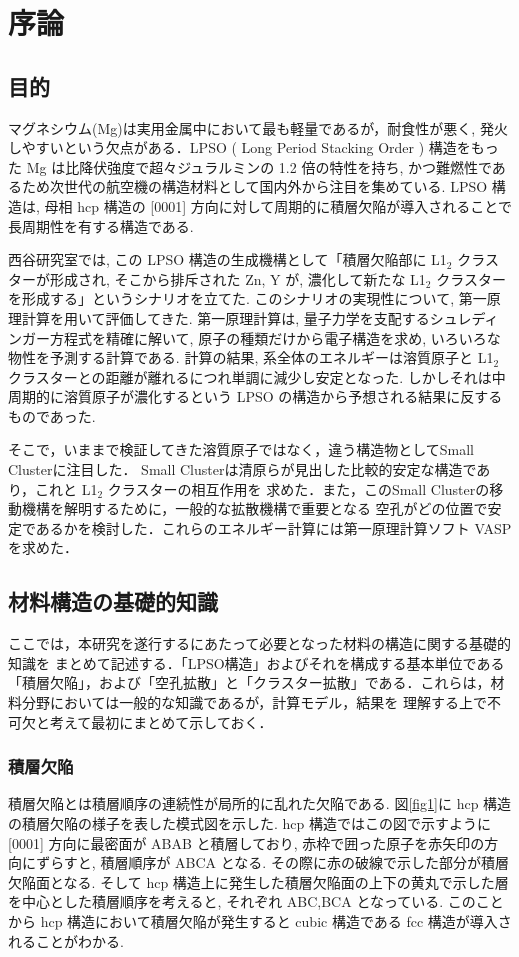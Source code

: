 \chapter{序論}

\section{目的}

マグネシウム(Mg)は実用金属中において最も軽量であるが，耐食性が悪く, 発火しやすいという欠点がある．LPSO ( Long Period Stacking Order ) 構造をもった Mg は比降伏強度で超々ジュラルミンの 1.2 倍の特性を持ち, かつ難燃性であるため次世代の航空機の構造材料として国内外から注目を集めている\cite{Th}. LPSO 構造は, 母相 hcp 構造の [0001] 方向に対して周期的に積層欠陥が導入されることで長周期性を有する構造である.

西谷研究室では, この LPSO 構造の生成機構として「積層欠陥部に L1$_2$ クラスターが形成され, そこから排斥された Zn, Y が, 濃化して新たな L1$_2$ クラスターを形成する」というシナリオを立てた. このシナリオの実現性について, 第一原理計算を用いて評価してきた. 第一原理計算は, 量子力学を支配するシュレディンガー方程式を精確に解いて, 原子の種類だけから電子構造を求め, いろいろな物性を予測する計算である. 計算の結果, 系全体のエネルギーは溶質原子と L1$_2$ クラスターとの距離が離れるにつれ単調に減少し安定となった. しかしそれは中周期的に溶質原子が濃化するという LPSO の構造から予想される結果に反するものであった.

そこで，いままで検証してきた溶質原子ではなく，違う構造物としてSmall Clusterに注目した．
Small Clusterは清原らが見出した比較的安定な構造であり，これと L1$_2$ クラスターの相互作用を
求めた\cite{kiyohara}．また，このSmall Clusterの移動機構を解明するために，一般的な拡散機構で重要となる
空孔がどの位置で安定であるかを検討した．これらのエネルギー計算には第一原理計算ソフト
VASPを求めた\cite{vasp}．

\section{材料構造の基礎的知識}
ここでは，本研究を遂行するにあたって必要となった材料の構造に関する基礎的知識を
まとめて記述する．「LPSO構造」およびそれを構成する基本単位である「積層欠陥」，および「空孔拡散」と「クラスター拡散」である．これらは，材料分野においては一般的な知識であるが，計算モデル，結果を
理解する上で不可欠と考えて最初にまとめて示しておく．

\subsection{積層欠陥}
積層欠陥とは積層順序の連続性が局所的に乱れた欠陥である. 図\ref{fig1}に hcp 構造の積層欠陥の様子を表した模式図を示した. hcp 構造ではこの図で示すように [0001] 方向に最密面が ABAB と積層しており, 赤枠で囲った原子を赤矢印の方向にずらすと, 積層順序が ABCA となる. その際に赤の破線で示した部分が積層欠陥面となる. そして hcp 構造上に発生した積層欠陥面の上下の黄丸で示した層を中心とした積層順序を考えると, それぞれ ABC,BCA となっている. このことから hcp 構造において積層欠陥が発生すると cubic 構造である fcc 構造が導入されることがわかる.

